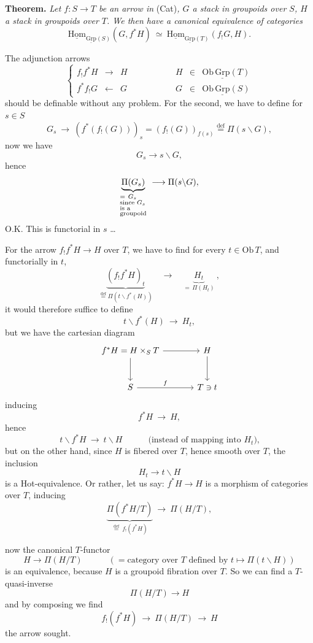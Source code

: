 \documentclass[11pt]{article}
\newcommand{\printedpage}[1]{\marginpar{\footnotesize p.~#1}}
\newcommand{\msp}[1]{\marginpar{\footnotesize [#1]}}
\newcommand{\uHom}{\underline{\mathrm{Hom}}}
\newcommand{\uGrp}{\underline{\mathrm{Grp}}}
\newcommand{\fl}{\longrightarrow}
\begin{document}
\printedpage{4}

\textbf{Theorem.} \textit{Let $f : S \fl T$ be an arrow in} (Cat)\textit{, $G$ a stack in groupoids over $S$, $H$ a stack in groupoids over $T$. We then have a canonical equivalence of categories}
\[
\boxed{\ \uHom_{\uGrp(S)}(G, f^*H) \ \simeq\ \uHom_{\uGrp(T)}(f_!G, H).\ }
\]

The adjunction arrows
\[
\left\{
\begin{array}{lclcrcl}
f_!f^*H & \fl & H & \qquad\qquad & H & \in & \mathrm{Ob}\,\uGrp(T)\\[4pt]
f^*f_!G & \longleftarrow & G & \qquad\qquad & G & \in & \mathrm{Ob}\,\uGrp(S)
\end{array}
\right.
\]
should be definable without any problem. For the second, we have to define for $s \in S$
\[
G_s \ \fl\ (f^*(f_!(G)))_s = (f_!(G))_{f(s)} \overset{\text{def}}{=} \Pi(s\backslash G),
\]
now we have
\[
G_s \fl s\backslash G,
\]
hence
\[
\underbrace{\Pi(G_s)}_{\begin{subarray}{l} =\ G_s\\ \text{since } G_s\\ \text{is a}\\ \text{groupoid}\end{subarray}} \ \fl \Pi(s\backslash G),
\]
O.K. This is functorial in $s$ \dots

\msp{page 5}
For the arrow $f_!f^*H \fl H$ over $T$, we have to find for every $t \in \mathrm{Ob}\,T$, and functorially in $t$,
\[
\underbrace{(f_!f^*H)_t}_{\overset{\text{def}}{=}\Pi(t\backslash f^*(H))} \quad \fl \quad \underbrace{H_t}_{=\,\Pi(H_t)} \ ,
\]
it would therefore suffice to define
\[
t\backslash f^*(H) \ \fl\ H_t,
\]
but we have the cartesian diagram
\[
\begin{tikzcd}[column sep=large, row sep=large]
f^*H = H \times_S T \arrow[r] \arrow[d] & H \arrow[d] \\
S \arrow[r, "f"] & T \ni t
\end{tikzcd}
\]
 inducing
\[
f^*H \ \fl\ H,
\]
\printedpage{5}
hence
\[
t\backslash f^*H \ \fl\ t\backslash H \qquad\quad \text{(instead of mapping into $H_t$),}
\]
but on the other hand, since $H$ is fibered over $T$, hence smooth over $T$, the inclusion
\[
H_t \fl t\backslash H
\]
is a Hot-equivalence. Or rather, let us say: $f^*H \fl H$ is a morphism of categories over $T$, inducing
\[
\underbrace{\Pi(f^*H/T)}_{\overset{\text{def}}{=}\ f_!(f^*H)} \ \fl\ \Pi(H/T),
\]

\msp{page 6}
now the canonical $T$-functor
\[
H \fl \Pi(H/T) \qquad\quad (= \text{category over } T \text{ defined by } t \longmapsto \Pi(t\backslash H))
\]
is an equivalence, because $H$ is a groupoid fibration over $T$. So we can find a $T$-quasi-inverse
\[
\Pi(H/T) \fl H
\]
and by composing we find
\[
f_!(f^*H) \ \fl\ \Pi(H/T) \ \fl\ H
\]
the arrow sought.
\end{document}
